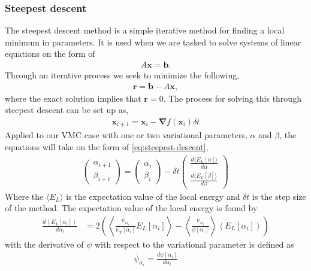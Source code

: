 \documentclass[11pt]{article}
\newcommand{\expect}[1]{\left\langle{#1}\right\rangle}
\begin{document}
\subsubsection{Steepest descent}
The steepest descent method is a simple iterative method for finding a local minimum in parameters. It is used when we are tasked to solve systems of linear equations on the form of
\begin{align*}
	A \mathbf{x} = \mathbf{b}.
\end{align*}
Through an iterative process we seek to minimize the following,
\begin{align*}
	\mathbf{r} = \mathbf{b} - A \mathbf{x},
\end{align*}
where the exact solution implies that $\mathbf{r}=0$. The process for solving this through steepest descent can be set up as, 
\begin{align}
	\mathbf{x}_{i+1} = \mathbf{x}_i - \bm{\nabla} f(\mathbf{x}_i) \delta t
	\label{eq:steepest-descent}
\end{align}
Applied to our VMC case with one or two variational parameters, $\alpha$ and $\beta$, the equations will take on the form of \eqref{eq:steepest-descent},
\begin{align}
	\begin{pmatrix}
		\alpha_{i+1} \\
		\beta_{i+1}
	\end{pmatrix}
	=
	\begin{pmatrix}
		\alpha_{i} \\
		\beta_{i}
	\end{pmatrix}
	- \delta t
	\begin{pmatrix}
		\frac{d\langle E_L[\alpha] \rangle}{d\alpha} \\
		\frac{d\langle E_L[\beta] \rangle}{d\beta}
	\end{pmatrix}
\end{align}
Where the $\langle E_L \rangle$ is the expectation value of the local energy and $\delta t$ is the step size of the method. The expectation value of the local energy is found by
\begin{align}
	\frac{d\expect{E_L[\alpha_i]}}{d\alpha_i} &= 2 \left( \expect{ \frac{\bar{\psi}_{\alpha_i}}{\psi_T[\alpha_i]}E_L[\alpha_i] } - \expect{\frac{\bar{\psi}_{\alpha_i}}{\psi[\alpha_i]}}\expect{E_L[\alpha_i]} \right)
	\label{eq:local-energy-variational-derivative}
\end{align}
with the derivative of $\psi$ with respect to the variational parameter is defined as
\begin{align*}
	\bar{\psi}_{\alpha_i} = \frac{d\psi[\alpha_i]}{d\alpha_i}
\end{align*}
\end{document}
